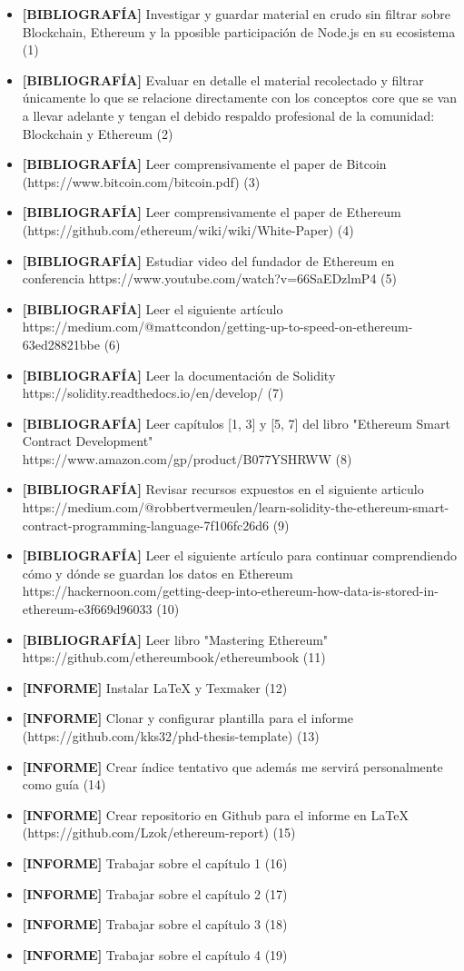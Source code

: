 \begin{itemize}
\item \textbf{[BIBLIOGRAFÍA]} Investigar y guardar material en crudo sin filtrar sobre Blockchain, Ethereum y la pposible participación de Node.js en su ecosistema (1)
\item \textbf{[BIBLIOGRAFÍA]} Evaluar en detalle el material recolectado y filtrar únicamente lo
que se relacione directamente con los conceptos core que se van a llevar adelante y tengan el
debido respaldo profesional de la comunidad: Blockchain y Ethereum (2)
\item \textbf{[BIBLIOGRAFÍA]} Leer comprensivamente el paper de Bitcoin 
(https://www.bitcoin.com/bitcoin.pdf) (3)
\item \textbf{[BIBLIOGRAFÍA]} Leer comprensivamente el paper de Ethereum 
(https://github.com/ethereum/wiki/wiki/White-Paper) (4)
\item \textbf{[BIBLIOGRAFÍA]} Estudiar video del fundador de Ethereum en conferencia 
https://www.youtube.com/watch?v=66SaEDzlmP4 (5)
\item \textbf{[BIBLIOGRAFÍA]} Leer el siguiente artículo 
https://medium.com/@mattcondon/getting-up-to-speed-on-ethereum-63ed28821bbe (6)
\item \textbf{[BIBLIOGRAFÍA]} Leer la documentación de Solidity https://solidity.readthedocs.io/en/develop/ (7)
\item \textbf{[BIBLIOGRAFÍA]} Leer capítulos [1, 3] y [5, 7] del libro "Ethereum Smart Contract Development" https://www.amazon.com/gp/product/B077YSHRWW (8)
\item \textbf{[BIBLIOGRAFÍA]} Revisar recursos expuestos en el siguiente articulo 
https://medium.com/@robbertvermeulen/learn-solidity-the-ethereum-smart-contract-programming-language-7f106fc26d6 (9)
\item \textbf{[BIBLIOGRAFÍA]} Leer el siguiente artículo para continuar comprendiendo cómo y dónde
se guardan los datos en Ethereum https://hackernoon.com/getting-deep-into-ethereum-how-data-is-stored-in-ethereum-e3f669d96033 (10)
\item \textbf{[BIBLIOGRAFÍA]} Leer libro "Mastering Ethereum" https://github.com/ethereumbook/ethereumbook (11)

\item \textbf{[INFORME]} Instalar LaTeX y Texmaker (12)
\item \textbf{[INFORME]} Clonar y configurar plantilla para el informe (https://github.com/kks32/phd-thesis-template) (13)
\item \textbf{[INFORME]} Crear índice tentativo que además me servirá personalmente como guía (14)
\item \textbf{[INFORME]} Crear repositorio en Github para el informe en LaTeX (https://github.com/Lzok/ethereum-report) (15)
\item \textbf{[INFORME]} Trabajar sobre el capítulo 1 (16)
\item \textbf{[INFORME]} Trabajar sobre el capítulo 2 (17)
\item \textbf{[INFORME]} Trabajar sobre el capítulo 3 (18)
\item \textbf{[INFORME]} Trabajar sobre el capítulo 4 (19)


\end{itemize}
